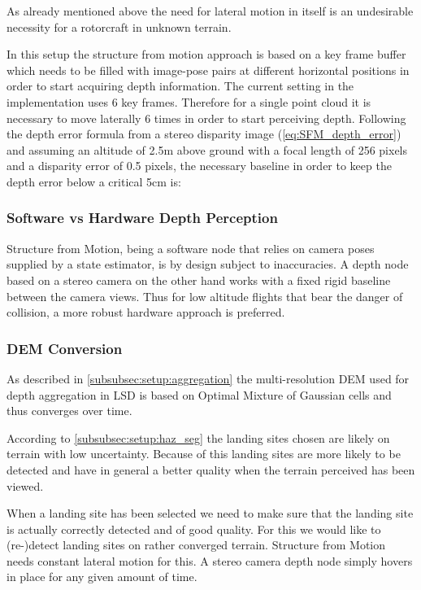 As already mentioned above the need for lateral motion in itself is an undesirable necessity for a rotorcraft in unknown terrain. 

In this setup the structure from motion approach is based on a key frame buffer which needs to be filled with image-pose pairs at different horizontal positions in order to start acquiring depth information. The current setting in the implementation \citet{SFM} uses 6 key frames. Therefore for a single point cloud it is necessary to move laterally 6 times in order to start perceiving depth. Following the depth error formula from a stereo disparity image (\ref{eq:SFM_depth_error}) and assuming an altitude of 2.5m above ground with a focal length of 256 pixels and a disparity error of 0.5 pixels, the necessary baseline in order to keep the depth error below a critical 5cm is:

\subsubsection{Software vs Hardware Depth Perception}

Structure from Motion, being a software node that relies on camera poses supplied by a state estimator, is by design subject to inaccuracies. A depth node based on a stereo camera on the other hand works with a fixed rigid baseline between the camera views. Thus for low altitude flights that bear the danger of collision, a more robust hardware approach is preferred.

\subsubsection{DEM Conversion}

As described in \cref{subsubsec:setup:aggregation} the multi-resolution DEM used for depth aggregation in LSD is based on Optimal Mixture of Gaussian cells and thus converges over time. 

According to \cref{subsubsec:setup:haz_seg} the landing sites chosen are likely on terrain with low uncertainty. Because of this landing sites are more likely to be detected and have in general a better quality when the terrain perceived has been viewed.

When a landing site has been selected we need to make sure that the landing site is actually correctly detected and of good quality. For this we would like to (re-)detect landing sites on rather converged terrain. Structure from Motion needs constant lateral motion for this. A stereo camera depth node simply hovers in place for any given amount of time.

